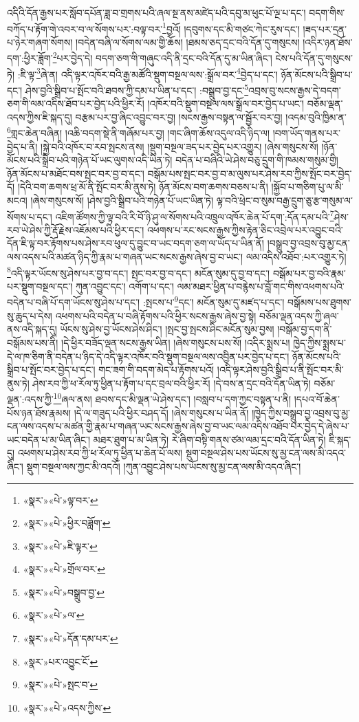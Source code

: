 འདིའི་དོན་རྒྱས་པར་སློབ་དཔོན་ཟླ་བ་གྲགས་པའི་ཞལ་སྔ་ནས་མཛེད་པའི་དབུ་མ་ཕུང་པོ་ལྔ་པ་དང་། བདག་གིས་བཀོད་པ་རྟོག་གེ་འབར་བ་ལ་སོགས་པར་:བལྟ་བར་\footnote{«སྣར་»«པེ་»ལྟ་བར་}བྱའོ། །དབུགས་དང་མི་གཙང་ཀེང་རུས་དང་། །ཟད་པར་དྲན་པ་ཉེར་གཞག་སོགས། །བདེན་བཞི་ལ་སོགས་ལམ་གྱི་ཆོས། །ཐམས་ཅད་དྲང་བའི་དོན་དུ་གསུངས། །འདིར་ཉན་ཐོས་དག་:ཕྱིར་ཟློག་\footnote{«སྣར་»«པེ་»ཕྱིར་བཟློག་}པར་བྱེད་དེ། བདག་ཅག་གི་གཞུང་འདི་ནི་དྲང་བའི་དོན་དུ་མ་ཡིན་ཞིང་། ངེས་པའི་དོན་དུ་གསུངས་ཏེ། :ཇི་ལྟ་\footnote{«སྣར་»«པེ་»ཇི་ལྟར་}ཞེ་ན། འདི་ལྟར་འཁོར་བའི་རྒྱ་མཚོའི་སྡུག་བསྔལ་ལས་:སྒྲོལ་བར་\footnote{«སྣར་»«པེ་»གྲོལ་བར་}བྱེད་པ་དང་། ཉོན་མོངས་པའི་སྒྲིབ་པ་དང་། ཤེས་བྱའི་སྒྲིབ་པ་སྤོང་བའི་ཐབས་ཀྱི་དམ་པ་ཡིན་པ་དང་། :བསྒྲུབ་བྱ་དང་\footnote{«སྣར་»«པེ་»བསྒྲུབ་བྱ་}འབྲས་བུ་སངས་རྒྱས་དེ་བདག་ཅག་གི་ལམ་འདིས་ཐོབ་པར་བྱེད་པའི་ཕྱིར་རོ། །འཁོར་བའི་སྡུག་བསྔལ་ལས་སྒྲོལ་བར་བྱེད་པ་ཡང་། བཅོམ་ལྡན་འདས་ཀྱིས་ཇི་སྐད་དུ། བརྩམ་པར་བྱ་ཞིང་འབྱུང་བར་བྱ། །སངས་རྒྱས་བསྟན་ལ་སྦྱོར་བར་བྱ། །འདམ་བུའི་ཁྱིམ་ན་\footnote{«སྣར་»«པེ་»ལ་}གླང་ཆེན་བཞིན། །འཆི་བདག་སྡེ་ནི་གཞོམ་པར་བྱ། །གང་ཞིག་ཆོས་འདུལ་འདི་ཉིད་ལ། །བག་ཡོད་གནས་པར་བྱེད་པ་ནི། །སྐྱེ་བའི་འཁོར་བ་རབ་སྤངས་ནས། །སྡུག་བསྔལ་ཟད་པར་བྱེད་པར་འགྱུར། །ཞེས་གསུངས་སོ། །ཉོན་མོངས་པའི་སྒྲིབ་པའི་གཉེན་པོ་ཡང་ལུགས་འདི་ཡིན་ཏེ། བདེན་པ་བཞིའི་ཡེ་ཤེས་བཅུ་དྲུག་གི་ཁམས་གསུམ་གྱི། ཉོན་མོངས་པ་མཐོང་བས་སྤང་བར་བྱ་བ་དང་། བསྒོམ་པས་སྤང་བར་བྱ་བ་མ་ལུས་པར་ཤེས་རབ་ཀྱིས་སྤོང་བར་བྱེད་དོ། །དེའི་བག་ཆགས་ཕྲ་མོ་ནི་སྤོང་བར་མི་ནུས་ཏེ། ཉོན་མོངས་བག་ཆགས་བཅས་པ་ནི། །སྐྱོབ་པ་གཅིག་པུ་ལ་མི་མངའ། །ཞེས་གསུངས་སོ། །ཤེས་བྱའི་སྒྲིབ་པའི་གཉེན་པོ་ཡང་ཡིན་ཏེ། ལྟ་བའི་ཕྲེང་བ་སུམ་བརྒྱ་དྲུག་ཅུ་རྩ་གསུམ་ལ་སོགས་པ་དང་། འཇིག་ཚོགས་ཀྱི་ལྟ་བའི་རི་བོ་ཉི་ཤུ་ལ་སོགས་པའི་འཁྲུལ་འཁོར་ཆེན་པོ་དག་:དོན་དམ་པའི་\footnote{«སྣར་»«པེ་»དོན་དམ་པར་}ཤེས་རབ་ཡེ་ཤེས་ཀྱི་རྡོ་རྗེས་འཇོམས་པའི་ཕྱིར་དང་། འཕགས་པ་རང་སངས་རྒྱས་ཀྱིས་རྟེན་ཅིང་འབྲེལ་པར་འབྱུང་བའི་དོན་ཇི་ལྟ་བར་རྟོགས་པས་ཤེས་རབ་ཕུལ་དུ་བྱུང་བ་ཡང་བདག་ཅག་ལ་ཡོད་པ་ཡིན་ནོ། །བསྒྲུབ་བྱ་འབྲས་བུ་མྱ་ངན་ལས་འདས་པའི་མཚན་ཉིད་ཀྱི་རྣམ་པ་གཞན་ཡང་སངས་རྒྱས་ཞེས་བྱ་བ་ཡང་། ལམ་འདིས་འཐོབ་:པར་འགྱུར་ཏེ། \footnote{«སྣར་»པར་འབྱུང་ངོ་}འདི་ལྟར་ཡོངས་སུ་ཤེས་པར་བྱ་བ་དང་། སྤང་བར་བྱ་བ་དང་། མངོན་སུམ་དུ་བྱ་བ་དང་། བསྒོམ་པར་བྱ་བའི་རྣམ་པར་སྡུག་བསྔལ་དང་། ཀུན་འབྱུང་དང་། འགོག་པ་དང་། ལམ་མཐར་ཕྱིན་པ་བརྙེས་པ་བློ་གང་གིས་འཕགས་པའི་བདེན་པ་བཞི་པོ་དག་ཡོངས་སུ་ཤེས་པ་དང་། :སྤངས་པ་\footnote{«སྣར་»«པེ་»སྤང་བ་}དང་། མངོན་སུམ་དུ་མཛད་པ་དང་། བསྒོམས་པས་ཐུགས་སུ་ཆུད་པ་དེས། འཕགས་པའི་བདེན་པ་བཞི་རྟོགས་པའི་ཕྱིར་སངས་རྒྱས་ཞེས་བྱ་སྟེ། བཅོམ་ལྡན་འདས་ཀྱི་ཞལ་ནས་འདི་སྐད་དུ། ཡོངས་སུ་ཤེས་བྱ་ཡོངས་ཤེས་ཤིང་། །སྤང་བྱ་སྤངས་ཤིང་མངོན་སུམ་བྱས། །བསྒོམ་བྱ་དག་ནི་བསྒོམས་པས་ནི། །དེ་ཕྱིར་བཟོད་ལྡན་སངས་རྒྱས་ཡིན། །ཞེས་གསུངས་པས་སོ། །འདིར་སྨྲས་པ། ཁྱེད་ཀྱིས་སྨྲས་པ་དེ་ལ་ཁ་ཅིག་ནི་བདེན་པ་ཉིད་དེ་འདི་ལྟར་འཁོར་བའི་སྡུག་བསྔལ་ལས་འབྱིན་པར་བྱེད་པ་དང་། ཉོན་མོངས་པའི་སྒྲིབ་པ་སྤོང་བར་བྱེད་པ་དང་། གང་ཟག་གི་བདག་མེད་པ་རྟོགས་པའོ། །འདི་ལྟར་ཤེས་བྱའི་སྒྲིབ་པ་ནི་སྤོང་བར་མི་ནུས་ཏེ། ཤེས་རབ་ཀྱི་ཕ་རོལ་ཏུ་ཕྱིན་པ་རྟོག་པ་དང་བྲལ་བའི་ཕྱིར་རོ། །དེ་བས་ན་དྲང་བའི་དོན་ཡིན་ཏེ། བཅོམ་ལྡན་:འདས་ཀྱི་\footnote{«སྣར་»«པེ་»འདས་ཀྱིས་}ཞལ་ནས། ཐབས་དང་མི་ལྡན་ཡེ་ཤེས་དང་། །བསླབ་པ་དག་ཀྱང་བསྟན་པ་ནི། །དཔའ་བོ་ཆེན་པོས་ཉན་ཐོས་རྣམས། །དེ་ལ་གཟུད་པའི་ཕྱིར་བཤད་དོ། །ཞེས་གསུངས་པ་ཡིན་ནོ། །ཁྱེད་ཀྱིས་བསྒྲུབ་བྱ་འབྲས་བུ་མྱ་ངན་ལས་འདས་པ་མཚན་གྱི་རྣམ་པ་གཞན་ཡང་སངས་རྒྱས་ཞེས་བྱ་བ་ཡང་ལམ་འདིས་འཐོབ་པར་བྱེད་དེ་ཞེས་པ་ཡང་བདེན་པ་མ་ཡིན་ཞིང་། མཐར་ཐུག་པ་མ་ཡིན་ཏེ། རེ་ཞིག་བསྟི་གནས་ཙམ་ལམ་དྲང་བའི་དོན་ཡིན་ཏེ། ཇི་སྐད་དུ། འཕགས་པ་ཤེས་རབ་ཀྱི་ཕ་རོལ་ཏུ་ཕྱིན་པ་ཆེན་པོ་ལས། སྡུག་བསྔལ་ཤེས་པས་ཡོངས་སུ་མྱ་ངན་ལས་མི་འདའ་ཞིང་། སྡུག་བསྔལ་ལས་ཀྱང་མི་འདའོ། །ཀུན་འབྱུང་ཤེས་པས་ཡོངས་སུ་མྱ་ངན་ལས་མི་འདའ་ཞིང་། 